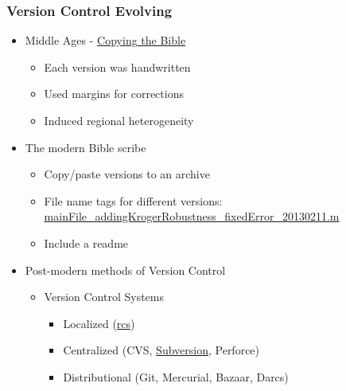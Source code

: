 \begin{frame}
    \frametitle{Version Control Evolving}
    \begin{itemize}
        \item Middle Ages - \href{http://en.wikipedia.org/wiki/Bible_translations}{Copying the Bible}
        \begin{itemize}
            \item Each version was handwritten
            \item Used margins for corrections
            \item Induced regional heterogeneity
        \end{itemize}
        \item The modern Bible scribe
        \begin{itemize}
            \item Copy/paste versions to an archive
            \item File name tags for different versions: \\ \url{mainFile_addingKrogerRobustness_fixedError_20130211.m}
            \item Include a readme
        \end{itemize}
        \item Post-modern methods of Version Control
        \begin{itemize}
            \item Version Control Systems
            \begin{itemize}
                \item Localized (\href{http://en.wikipedia.org/wiki/Revision_Control_System}{rcs})
                \item Centralized (CVS, \href{http://en.wikipedia.org/wiki/Apache_Subversion}{Subversion}, Perforce)
                \item Distributional (Git, Mercurial, Bazaar, Darcs)
            \end{itemize}
        \end{itemize}
    \end{itemize}
\end{frame}

